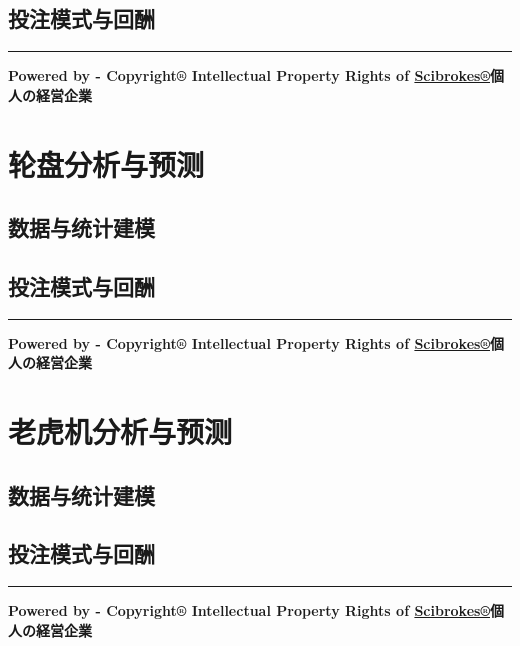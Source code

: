 \documentclass[]{book}
\theoremstyle{definition}
\theoremstyle{definition}
\theoremstyle{definition}
\theoremstyle{remark}
\begin{document}
\subsection{投注模式与回酬}

\begin{center}\rule{0.5\linewidth}{\linethickness}\end{center}

\textbf{Powered by - Copyright® Intellectual Property Rights of
\href{http://www.scibrokes.com}{Scibrokes®}個人の経営企業}

\section{轮盘分析与预测}

\hypertarget{-1}{%
\subsection{数据与统计建模}\label{-1}}

\hypertarget{-1}{%
\subsection{投注模式与回酬}\label{-1}}

\begin{center}\rule{0.5\linewidth}{\linethickness}\end{center}

\textbf{Powered by - Copyright® Intellectual Property Rights of
\href{http://www.scibrokes.com}{Scibrokes®}個人の経営企業}

\section{老虎机分析与预测}

\hypertarget{-2}{%
\subsection{数据与统计建模}\label{-2}}

\hypertarget{-2}{%
\subsection{投注模式与回酬}\label{-2}}

\begin{center}\rule{0.5\linewidth}{\linethickness}\end{center}

\textbf{Powered by - Copyright® Intellectual Property Rights of
\href{http://www.scibrokes.com}{Scibrokes®}個人の経営企業}
\end{document}
